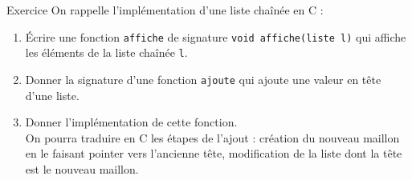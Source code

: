 \documentclass[10pt]{beamer}
\begin{document}
\begin{frame}{\Ctitle}{\stitle}
	\begin{exampleblock}{Exercice}
		On rappelle l'implémentation d'une liste chaînée en C :
		\begin{enumerate}
			\item<2-> Écrire une fonction {\tt affiche} de signature \texttt{void affiche(liste l)} qui affiche les éléments de la liste chaînée {\tt l}.
			\item<3-> Donner la signature d'une fonction {\tt ajoute} qui ajoute une valeur en tête d'une liste.
			\item<4-> Donner l'implémentation de cette fonction.\\
				{\small \aide \; On pourra traduire en C les étapes de l'ajout : création du nouveau maillon en le faisant pointer vers l'ancienne tête, modification de la liste dont la tête est le nouveau maillon.}
		\end{enumerate}
	\end{exampleblock}
\end{frame}
\end{document}
